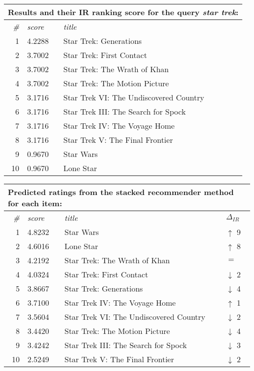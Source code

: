 \begin{table}[h]
  \centering 

  \begin{tabular*}{0.9\textwidth}{ r l p{8cm} }
    \multicolumn{3}{l}{Results and their IR ranking score for the query \emph{star trek}:}\\
    \toprule
    \emph{\#} & \emph{score} & \emph{title}\\
    \midrule
    1 & 4.2288 & Star Trek: Generations                 \\
    2 & 3.7002 & Star Trek: First Contact               \\
    3 & 3.7002 & Star Trek: The Wrath of Khan           \\
    4 & 3.7002 & Star Trek: The Motion Picture          \\
    5 & 3.1716 & Star Trek VI: The Undiscovered Country \\
    6 & 3.1716 & Star Trek III: The Search for Spock    \\
    7 & 3.1716 & Star Trek IV: The Voyage Home          \\
    8 & 3.1716 & Star Trek V: The Final Frontier        \\
    9 & 0.9670 & Star Wars                              \\
    10& 0.9670 & Lone Star                              \\
    \bottomrule
  \end{tabular*}

  \vspace{1em} 

  \begin{tabular*}{0.9\textwidth}{ r l p{8.5cm} l }
    \multicolumn{4}{l}{Predicted ratings from the stacked recommender method for each item:}\\
    \toprule
    \emph{\#} & \emph{score} & \emph{title} & $\Delta_{IR}$\\
    \midrule
    1 & 4.8232 & Star Wars                              & \color{green} $\uparrow$ 9 \\
    2 & 4.6016 & Lone Star                              & \color{green} $\uparrow$ 8 \\
    3 & 4.2192 & Star Trek: The Wrath of Khan           & \color{black} $=$ \\
    4 & 4.0324 & Star Trek: First Contact               & \color{red} $\downarrow$ 2 \\
    5 & 3.8667 & Star Trek: Generations                 & \color{red} $\downarrow$ 4 \\
    6 & 3.7100 & Star Trek IV: The Voyage Home          & \color{green} $\uparrow$ 1 \\
    7 & 3.5604 & Star Trek VI: The Undiscovered Country & \color{red} $\downarrow$ 2 \\
    8 & 3.4420 & Star Trek: The Motion Picture          & \color{red} $\downarrow$ 4 \\
    9 & 3.4242 & Star Trek III: The Search for Spock    & \color{red} $\downarrow$ 3 \\
    10& 2.5249 & Star Trek V: The Final Frontier        & \color{red} $\downarrow$ 2 \\
    \bottomrule
  \end{tabular*}


\end{table}
